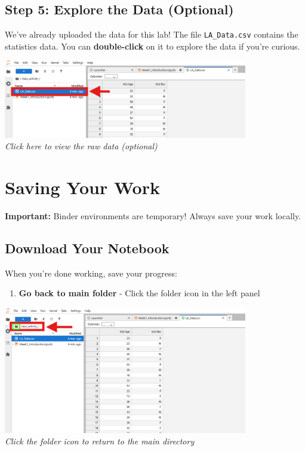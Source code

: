 \documentclass[11pt,a4paper]{article}
\begin{document}
\subsection{Step 5: Explore the Data (Optional)}

We've already uploaded the data for this lab! The file \texttt{LA\_Data.csv} contains the statistics data. You can \textbf{double-click} on it to explore the data if you're curious.

\begin{center}
\includegraphics[width=0.8\textwidth]{../Image_5.png}\\
\textit{Click here to view the raw data (optional)}
\end{center}

\section{Saving Your Work}

\begin{warningbox}
\textbf{Important:} Binder environments are temporary! Always save your work locally.
\end{warningbox}

\subsection{Download Your Notebook}

When you're done working, save your progress:

\begin{enumerate}
    \item \textbf{Go back to main folder} - Click the folder icon in the left panel
\end{enumerate}

\begin{center}
\includegraphics[width=0.8\textwidth]{../Image_6.png}\\
\textit{Click the folder icon to return to the main directory}
\end{center}
\end{document}
